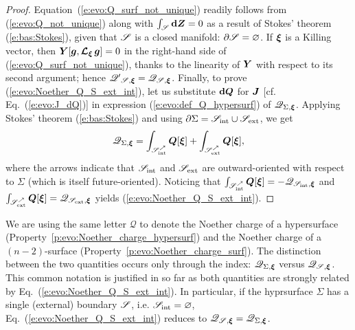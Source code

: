 \begin{proof}
Equation~(\ref{e:evo:Q_surf_not_unique}) readily follows from (\ref{e:evo:Q_not_unique})
along with $\int_{\mathscr{S}} \mathbf{d}\bm{Z} = 0$ as a result of Stokes' theorem (\ref{e:bas:Stokes}),
given that $\mathscr{S}$ is a closed manifold:
$\partial\mathscr{S} = \varnothing$.
If $\bm{\xi}$ is a Killing vector, then
$\bm{Y}[\bm{g},\bm{\mathcal{L}}_{\bm{\xi}}\,\bm{g}] = 0$ in the right-hand side of (\ref{e:evo:Q_surf_not_unique}), thanks to the linearity of $\bm{Y}$ with respect to its
second argument; hence $\mathscr{Q'}_{\mathscr{S},\bm{\xi}} = \mathscr{Q}_{\mathscr{S},\bm{\xi}}$.
Finally, to prove (\ref{e:evo:Noether_Q_S_ext_int}),
let us substitute $\mathbf{d}\bm{Q}$ for $\bm{J}$ [cf. Eq.~(\ref{e:evo:J_dQ})]
in expression (\ref{e:evo:def_Q_hypersurf}) of
$\mathscr{Q}_{\Sigma,\bm{\xi}}$. Applying
Stokes' theorem (\ref{e:bas:Stokes}) and using
$\partial\Sigma = \mathscr{S}_{\rm int} \cup \mathscr{S}_{\rm ext}$, we get
\[
    \mathscr{Q}_{\Sigma,\bm{\xi}} = \int_{\mathscr{S}_{\rm int}^\nearrow} \bm{Q}[\bm{\xi}]
    + \int_{\mathscr{S}_{\rm ext}^\nearrow} \bm{Q}[\bm{\xi}] ,
\]
where the arrows indicate that $\mathscr{S}_{\rm int}$ and  $\mathscr{S}_{\rm ext}$
are outward-oriented with respect to $\Sigma$ (which is itself future-oriented).
Noticing that $\int_{\mathscr{S}_{\rm int}^\nearrow} \bm{Q}[\bm{\xi}] = - \mathscr{Q}_{\mathscr{S}_{\rm int},\bm{\xi}}$
and $\int_{\mathscr{S}_{\rm ext}^\nearrow} \bm{Q}[\bm{\xi}] = \mathscr{Q}_{\mathscr{S}_{\rm ext},\bm{\xi}}$
yields (\ref{e:evo:Noether_Q_S_ext_int}).
\end{proof}

\begin{remark}
We are using the same letter $\mathscr{Q}$ to denote the Noether charge of a hypersurface
(Property~\ref{p:evo:Noether_charge_hypersurf}) and the Noether charge of
a $(n-2)$-surface (Property~\ref{p:evo:Noether_charge_surf}). The distinction between the two quantities
occurs only through the index: $\mathscr{Q}_{\Sigma,\bm{\xi}}$ versus $\mathscr{Q}_{\mathscr{S},\bm{\xi}}$.
This common notation is justified in so far as both quantities are strongly related by
Eq.~(\ref{e:evo:Noether_Q_S_ext_int}). In particular, if the hyprsurface $\Sigma$ has
a single (external) boundary $\mathscr{S}$, i.e. $\mathscr{S}_{\rm int} = \varnothing$, Eq.~(\ref{e:evo:Noether_Q_S_ext_int}) reduces to
$\mathscr{Q}_{\mathscr{S},\bm{\xi}} = \mathscr{Q}_{\Sigma,\bm{\xi}}$.
\end{remark}

